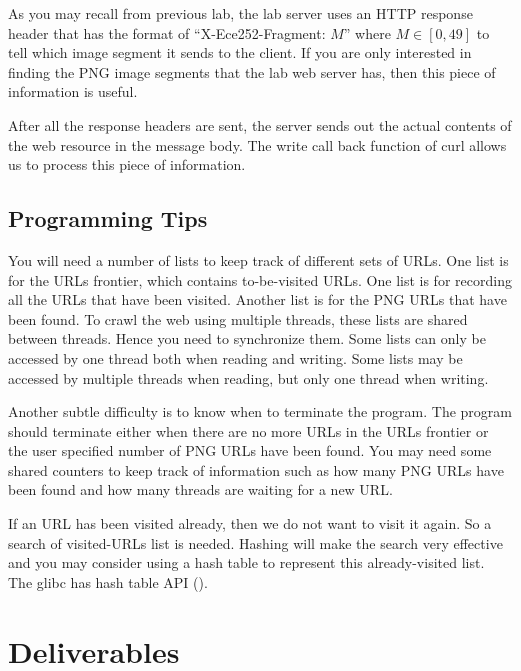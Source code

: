 As you may recall from previous lab, the lab server uses an HTTP response header that has the format of ``X-Ece252-Fragment: $M$'' where $M \in [0, 49]$ to tell which image segment it sends to the client. If you are only interested in finding the PNG image segments that the lab web server has, then this piece of information is useful.

After all the response headers are sent, the server sends out the actual contents of the web resource in the message body. The write call back function of curl allows us to process this piece of information. 
\subsection{Programming Tips}
You will need a number of lists to keep track of different sets of URLs. One list is for the URLs frontier, which contains to-be-visited URLs. One list is for recording all the URLs that have been visited. Another list is for the PNG URLs that have been found. To crawl the web using multiple threads, these lists are shared between threads. Hence you need to synchronize them. Some lists can only be accessed by one thread both when reading and writing. Some lists may be accessed by multiple threads when reading, but only one thread when writing.

Another subtle difficulty is to know when to terminate the program. The program should terminate either when there are no more URLs in the URLs frontier or the user specified number of PNG URLs have been found. You may need some shared counters to keep track of information such as how many PNG URLs have been found and how many threads are waiting for a new URL.

If an URL has been visited already, then we do not want to visit it again. So a search of visited-URLs list is needed. Hashing will make the search very effective and you may consider using a hash table to represent this already-visited list. The glibc has hash table API ().

\section{Deliverables}
